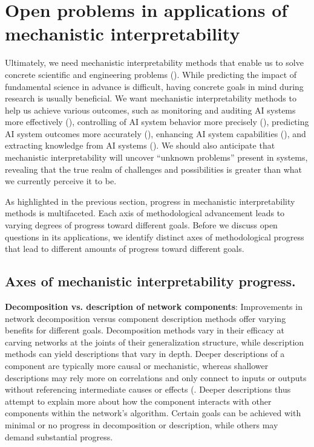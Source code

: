 \section{Open problems in applications of mechanistic interpretability}
\label{sec:open-problems-applications}

Ultimately, we need mechanistic interpretability methods that enable us to solve concrete scientific and engineering problems (). While predicting the impact of fundamental science in advance is difficult, having concrete goals in mind during research is usually beneficial. We want mechanistic interpretability methods to help us achieve various outcomes, such as monitoring and auditing AI systems more effectively (), controlling of AI system behavior more precisely (), predicting AI system outcomes more accurately (), enhancing AI system capabilities (), and extracting knowledge from AI systems (). We should also anticipate that mechanistic interpretability will uncover “unknown problems” present in systems, revealing that the true realm of challenges and possibilities is greater than what we currently perceive it to be.

As highlighted in the previous section, progress in mechanistic interpretability methods is multifaceted. Each axis of methodological advancement leads to varying degrees of progress toward different goals. Before we discuss open questions in its applications, we identify distinct axes of methodological progress that lead to different amounts of progress toward different goals. 


\subsection{Axes of mechanistic interpretability progress.}
\label{subsec:axes}

\textbf{Decomposition vs. description of network components}: Improvements in network decomposition versus component description methods offer varying benefits for different goals. Decomposition methods vary in their efficacy at carving networks at the joints of their generalization structure, while description methods can yield descriptions that vary in depth. Deeper descriptions of a component are typically more causal or mechanistic, whereas shallower descriptions may rely more on correlations and only connect to inputs or outputs without referencing intermediate causes or effects (. Deeper descriptions thus attempt to explain more about how the component interacts with other components within the network's algorithm. Certain goals can be achieved with minimal or no progress in decomposition or description, while others may demand substantial progress.

